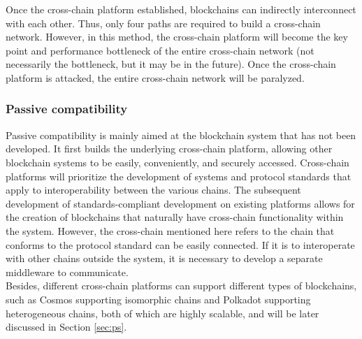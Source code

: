\begin{enumerate}
\begin{figure}[H]
        \end{figure}
  Once the cross-chain platform established, blockchains can indirectly interconnect with each other. Thus, only four paths are required to build a cross-chain network. However, in this method, the cross-chain platform will become the key point and performance bottleneck of the entire cross-chain network (not necessarily the bottleneck, but it may be in the future). Once the cross-chain platform is attacked, the entire cross-chain network will be paralyzed.
\end{enumerate}
\subsubsection{Passive compatibility}
\noindent Passive compatibility is mainly aimed at the blockchain system that has not been developed. It first builds the underlying cross-chain platform, allowing other blockchain systems to be easily, conveniently, and securely accessed. Cross-chain platforms will prioritize the development of systems and protocol standards that apply to interoperability between the various chains. The subsequent development of standards-compliant development on existing platforms allows for the creation of blockchains that naturally have cross-chain functionality within the system. However, the cross-chain mentioned here refers to the chain that conforms to the protocol standard can be easily connected. If it is to interoperate with other chains outside the system, it is necessary to develop a separate middleware to communicate.\\

\noindent Besides, different cross-chain platforms can support different types of blockchains, such as Cosmos supporting isomorphic chains and Polkadot supporting heterogeneous chains, both of which are highly scalable, and will be later discussed in Section \ref{sec:ps}.